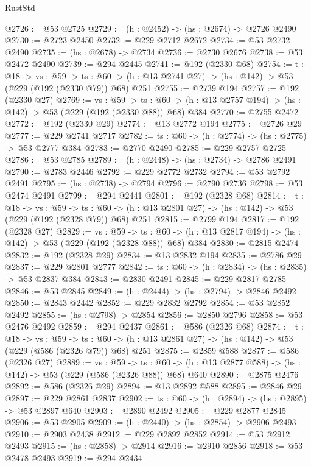 \begin{lexlean}{RustStd}
\begin{coremodule}
@2726 := @53 @2725
@2729 := (h : @2452) -> (hs : @2674) -> @2726 @2490
@2730 := @2723 @2450
@2732 := @229 @2712 @2672
@2734 := @53 @2732 @2490
@2735 := (hs : @2678) -> @2734
@2736 := @2730 @2676
@2738 := @53 @2472 @2490
@2739 := @294 @2445
@2741 := @192 (@2330 @68)
@2754 := {t : @18} ->
  {vs : @59} ->
  {ts : @60} -> (h : @13 @2741 @27) -> (hs : @142) -> @53 (@229 (@192 (@2330 @79)) @68) @251
@2755 := @2739 @194
@2757 := @192 (@2330 @27)
@2769 := {vs : @59} ->
  {ts : @60} -> (h : @13 @2757 @194) -> (hs : @142) -> @53 (@229 (@192 (@2330 @88)) @68) @384
@2770 := @2755 @2472
@2772 := @192 (@2330 @29)
@2774 := @13 @2772 @194
@2775 := @2726 @29
@2777 := @229 @2741 @2717
@2782 := {ts : @60} -> (h : @2774) -> (hs : @2775) -> @53 @2777 @384
@2783 := @2770 @2490
@2785 := @229 @2757 @2725
@2786 := @53 @2785
@2789 := (h : @2448) -> (hs : @2734) -> @2786 @2491
@2790 := @2783 @2446
@2792 := @229 @2772 @2732
@2794 := @53 @2792 @2491
@2795 := (hs : @2738) -> @2794
@2796 := @2790 @2736
@2798 := @53 @2474 @2491
@2799 := @294 @2441
@2801 := @192 (@2328 @68)
@2814 := {t : @18} ->
  {vs : @59} ->
  {ts : @60} -> (h : @13 @2801 @27) -> (hs : @142) -> @53 (@229 (@192 (@2328 @79)) @68) @251
@2815 := @2799 @194
@2817 := @192 (@2328 @27)
@2829 := {vs : @59} ->
  {ts : @60} -> (h : @13 @2817 @194) -> (hs : @142) -> @53 (@229 (@192 (@2328 @88)) @68) @384
@2830 := @2815 @2474
@2832 := @192 (@2328 @29)
@2834 := @13 @2832 @194
@2835 := @2786 @29
@2837 := @229 @2801 @2777
@2842 := {ts : @60} -> (h : @2834) -> (hs : @2835) -> @53 @2837 @384
@2843 := @2830 @2491
@2845 := @229 @2817 @2785
@2846 := @53 @2845
@2849 := (h : @2444) -> (hs : @2794) -> @2846 @2492
@2850 := @2843 @2442
@2852 := @229 @2832 @2792
@2854 := @53 @2852 @2492
@2855 := (hs : @2798) -> @2854
@2856 := @2850 @2796
@2858 := @53 @2476 @2492
@2859 := @294 @2437
@2861 := @586 (@2326 @68)
@2874 := {t : @18} ->
  {vs : @59} ->
  {ts : @60} -> (h : @13 @2861 @27) -> (hs : @142) -> @53 (@229 (@586 (@2326 @79)) @68) @251
@2875 := @2859 @588
@2877 := @586 (@2326 @27)
@2889 := {vs : @59} ->
  {ts : @60} -> (h : @13 @2877 @588) -> (hs : @142) -> @53 (@229 (@586 (@2326 @88)) @68) @640
@2890 := @2875 @2476
@2892 := @586 (@2326 @29)
@2894 := @13 @2892 @588
@2895 := @2846 @29
@2897 := @229 @2861 @2837
@2902 := {ts : @60} -> (h : @2894) -> (hs : @2895) -> @53 @2897 @640
@2903 := @2890 @2492
@2905 := @229 @2877 @2845
@2906 := @53 @2905
@2909 := (h : @2440) -> (hs : @2854) -> @2906 @2493
@2910 := @2903 @2438
@2912 := @229 @2892 @2852
@2914 := @53 @2912 @2493
@2915 := (hs : @2858) -> @2914
@2916 := @2910 @2856
@2918 := @53 @2478 @2493
@2919 := @294 @2434

\end{coremodule}
\end{lexlean}
